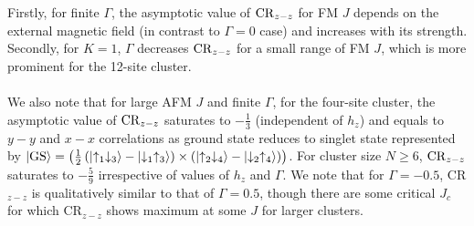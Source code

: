 \documentclass[aps,amsmath,twocolumn,amssymb,floatfix,showpacs,superscriptaddress,nofootinbib,longbibliography]{revtex4-1}
\begin{document}
\\\\\indent
Firstly, for finite $\Gamma$, the asymptotic value of ${\rm CR}_{z-z}$ for FM $J$ depends on the external magnetic field (in contrast to $\Gamma=0$ case) and increases with its strength. Secondly, for $K=1$, $\Gamma$ decreases ${\rm CR}_{z-z}$ for a small range of FM $J$, which is more prominent for the 12-site cluster.
\\\\\indent
We also note that for large AFM $J$ and finite $\Gamma$, for the four-site cluster, the asymptotic value of ${\rm CR}_{z-z}$ saturates to $-\frac{1}{3}$ (independent of $h_z$) and equals to $y-y$ and $x-x$ correlations as ground state reduces to singlet state represented by $\ket{\rm GS}= \left( \frac{1}{2}\left(\ket{\uparrow_1\downarrow_3}- \ket{\downarrow_1\uparrow_3}\right) \times \left( \ket{\uparrow_2\downarrow_4}-\ket{\downarrow_2\uparrow_4}\right)\right)$. For cluster size $N\geq 6$, ${\rm CR}_{z-z}$ saturates to $- \frac{5}{9}$ irrespective of values of $h_z$ and $\Gamma$.
We note that for $\Gamma=-0.5$, CR$_{z-z}$ is qualitatively similar to that of $\Gamma=0.5$, though there are some critical $J_c$
for which CR$_{z-z}$ shows maximum at some $J$ for larger clusters.\\
\indent
\end{document}
